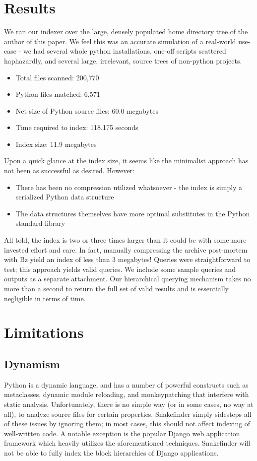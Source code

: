 \documentclass{article}
\begin{document}
\section{Results}

We ran our indexer over the large, densely populated home directory tree of the author of this paper. We feel this was an accurate simulation of a real-world use-case - we had several whole python installations, one-off scripts scattered haphazardly, and several large, irrelevant, source trees of non-python projects.

\begin{itemize}
	\item Total files scanned: 200,770
	\item Python files matched: 6,571
	\item Net size of Python source files: 60.0 megabytes
	\item Time required to index: 118.175 seconds
	\item Index size: 11.9 megabytes
	\end{itemize}

Upon a quick glance at the index size, it seems like the minimalist approach has not been as successful as desired. However:
	\begin{itemize}
	\item There has been no compression utilized whatsoever - the index is simply a serialized Python data structure
	\item The data structures themselves have more optimal substitutes in the Python standard library
	\end{itemize}
	All told, the index is two or three times larger than it could be with some more invested effort and care. In fact, manually compressing the archive post-mortem with Bz yield an index of less than 3 megabytes!
	Queries were straightforward to test; this approach yields valid queries.
	We include some sample queries and outputs as a separate attachment. Our hierarchical querying mechanism takes no more than a second
	to return the full set of valid results and is essentially negligible in terms of time.

\section{Limitations}
\subsection{Dynamism}
Python is a dynamic language, and has a number of powerful constructs such as metaclasses, dynamic module reloading, and monkeypatching that interfere with static analysis. Unfortunately, there is no simple way (or in some cases, no way at all), to analyze source files for certain properties. Snakefinder simply sidesteps all of these issues by ignoring them; in most cases, this should not affect indexing of well-written code.
A notable exception is the popular Django web application framework which heavily utilizes the aforementioned techniques. Snakefinder will not be able to fully index the block hierarchies of Django applications.
\end{document}
